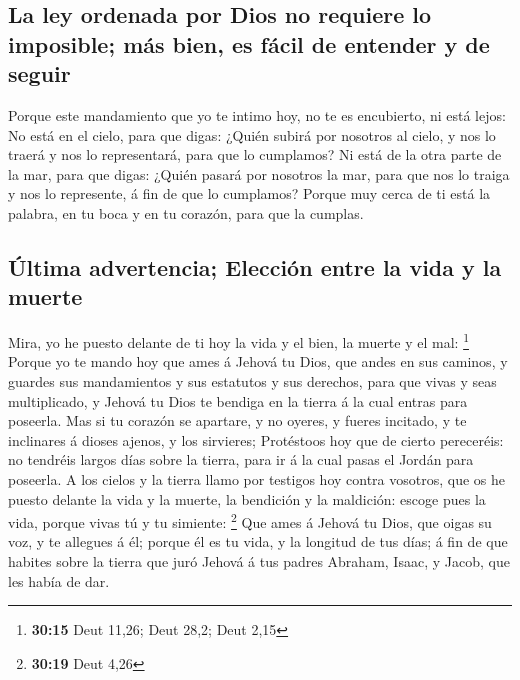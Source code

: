 \hypertarget{la-ley-ordenada-por-dios-no-requiere-lo-imposible-muxe1s-bien-es-fuxe1cil-de-entender-y-de-seguir}{%
\subsection{La ley ordenada por Dios no requiere lo imposible; más bien,
es fácil de entender y de
seguir}\label{la-ley-ordenada-por-dios-no-requiere-lo-imposible-muxe1s-bien-es-fuxe1cil-de-entender-y-de-seguir}}

 Porque este mandamiento que yo te intimo hoy, no te es
encubierto, ni está lejos:  No está en el cielo, para que
digas: ¿Quién subirá por nosotros al cielo, y nos lo traerá y nos lo
representará, para que lo cumplamos?  Ni está de la otra
parte de la mar, para que digas: ¿Quién pasará por nosotros la mar, para
que nos lo traiga y nos lo represente, á fin de que lo cumplamos?
 Porque muy cerca de ti está la palabra, en tu boca y en
tu corazón, para que la cumplas.

\hypertarget{uxfaltima-advertencia-elecciuxf3n-entre-la-vida-y-la-muerte}{%
\subsection{Última advertencia; Elección entre la vida y la
muerte}\label{uxfaltima-advertencia-elecciuxf3n-entre-la-vida-y-la-muerte}}

 Mira, yo he puesto delante de ti hoy la vida y el bien,
la muerte y el mal: \footnote{\textbf{30:15} Deut 11,26; Deut 28,2; Deut
  2,15}  Porque yo te mando hoy que ames á Jehová tu
Dios, que andes en sus caminos, y guardes sus mandamientos y sus
estatutos y sus derechos, para que vivas y seas multiplicado, y Jehová
tu Dios te bendiga en la tierra á la cual entras para poseerla.
 Mas si tu corazón se apartare, y no oyeres, y fueres
incitado, y te inclinares á dioses ajenos, y los sirvieres;
 Protéstoos hoy que de cierto pereceréis: no tendréis
largos días sobre la tierra, para ir á la cual pasas el Jordán para
poseerla.  A los cielos y la tierra llamo por testigos
hoy contra vosotros, que os he puesto delante la vida y la muerte, la
bendición y la maldición: escoge pues la vida, porque vivas tú y tu
simiente: \footnote{\textbf{30:19} Deut 4,26}  Que ames á
Jehová tu Dios, que oigas su voz, y te allegues á él; porque él es tu
vida, y la longitud de tus días; á fin de que habites sobre la tierra
que juró Jehová á tus padres Abraham, Isaac, y Jacob, que les había de
dar.

